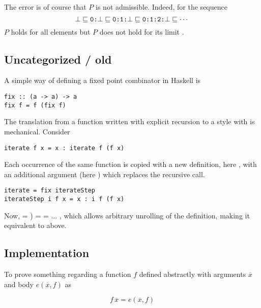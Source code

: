 The error is of course that $P$ is not
admissible. Indeed, for the sequence
\begin{equation*}
\bot \sqsubseteq
\hs{0:}\bot \sqsubseteq
\hs{0:1:}\bot \sqsubseteq
\hs{0:1:2:}\bot \sqsubseteq
\cdots
\end{equation*}
$P$ holds for all elements but $P$ does not hold for its limit \hs{[0..]}.

\subsection{Uncategorized / old}

A simple way of defining a fixed point combinator in Haskell is
\begin{verbatim}
fix :: (a -> a) -> a
fix f = f (fix f)
\end{verbatim}

The translation from a function written with explicit recursion to a
style with  is mechanical. Consider 

\begin{verbatim}
iterate f x = x : iterate f (f x)
\end{verbatim}

Each occurrence of the same function is copied with a new definition,
here , with an additional argument (here ) which
replaces the recursive call.

\begin{verbatim}
iterate = fix iterateStep
iterateStep i f x = x : i f (f x)
\end{verbatim}

Now,
 =
) =
 = ...
, which allows arbitrary unrolling of the definition, making it
  equivalent to  above.

\subsection{Implementation}

To prove something regarding a function $f$ defined abstractly with
arguments $\overline{x}$ and body $e(\overline{x},f)$ as

\begin{equation*}
f \, \overline{x} = e(\overline{x},f)
\end{equation*}



